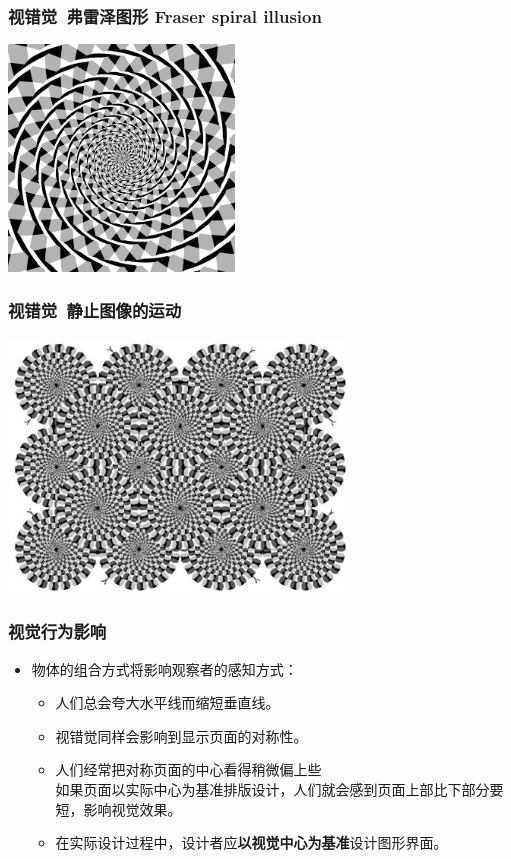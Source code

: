 \documentclass{beamer}
\begin{document}
\begin{frame}
	\frametitle{视错觉~{\small 弗雷泽图形 Fraser spiral illusion}}
	\begin{center}
	\includegraphics[width=6cm]{images/597px-Fraser_spiral.svg.png}\\
	\end{center}
\end{frame}

\begin{frame}
	\frametitle{视错觉~{\small 静止图像的运动}}
	\includegraphics[width=9cm]{images/illusion1.jpg}
\end{frame}

\begin{frame}
	\frametitle{视觉行为影响}
	\beamertemplatetransparentcovereddynamicmedium
	\begin{itemize}
		\item 物体的组合方式将影响观察者的感知方式：
		\begin{itemize}[<+->]
			\item 人们总会夸大水平线而缩短垂直线。
			\item 视错觉同样会影响到显示页面的对称性。
			\item 人们经常把对称页面的中心看得稍微偏上些\\{\tiny 如果页面以实际中心为基准排版设计，人们就会感到页面上部比下部分要短，影响视觉效果}。
			\item 在实际设计过程中，设计者应\textbf{以视觉中心为基准}设计图形界面。
		\end{itemize}
	\end{itemize}
\end{frame}
\end{document}
